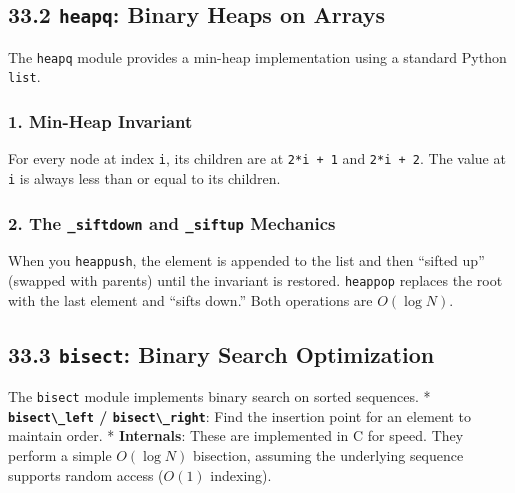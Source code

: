 \hypertarget{heapq-binary-heaps-on-arrays}{%
\subsection{\texorpdfstring{33.2 \texttt{heapq}: Binary Heaps on
Arrays}{33.2 heapq: Binary Heaps on Arrays}}\label{heapq-binary-heaps-on-arrays}}

The \passthrough{\lstinline!heapq!} module provides a min-heap
implementation using a standard Python \passthrough{\lstinline!list!}.

\hypertarget{min-heap-invariant}{%
\subsubsection{1. Min-Heap Invariant}\label{min-heap-invariant}}

For every node at index \passthrough{\lstinline!i!}, its children are at
\passthrough{\lstinline!2*i + 1!} and \passthrough{\lstinline!2*i + 2!}.
The value at \passthrough{\lstinline!i!} is always less than or equal to
its children.

\hypertarget{the-_siftdown-and-_siftup-mechanics}{%
\subsubsection{\texorpdfstring{2. The \texttt{\_siftdown} and
\texttt{\_siftup}
Mechanics}{2. The \_siftdown and \_siftup Mechanics}}\label{the-_siftdown-and-_siftup-mechanics}}

When you \passthrough{\lstinline!heappush!}, the element is appended to
the list and then ``sifted up'' (swapped with parents) until the
invariant is restored. \passthrough{\lstinline!heappop!} replaces the
root with the last element and ``sifts down.'' Both operations are
\(O(\log N)\).

\hypertarget{bisect-binary-search-optimization}{%
\subsection{\texorpdfstring{33.3 \texttt{bisect}: Binary Search
Optimization}{33.3 bisect: Binary Search Optimization}}\label{bisect-binary-search-optimization}}

The \passthrough{\lstinline!bisect!} module implements binary search on
sorted sequences. * \textbf{\passthrough{\lstinline!bisect\_left!} /
\passthrough{\lstinline!bisect\_right!}}: Find the insertion point for
an element to maintain order. * \textbf{Internals}: These are
implemented in C for speed. They perform a simple \(O(\log N)\)
bisection, assuming the underlying sequence supports random access
(\(O(1)\) indexing).

